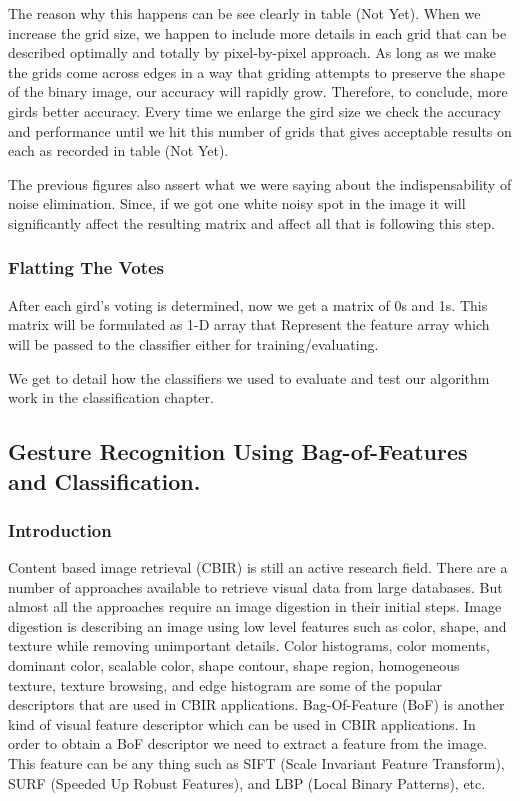 \documentclass[12pt,fleqn]{book} %
\begin{document}
The reason why this happens can be see clearly in table (Not Yet). When we increase the grid size, we happen to include more details in each grid that can be described optimally and totally by pixel-by-pixel approach. As long as we make the grids come across edges in a way that griding attempts to preserve the shape of the binary image, our accuracy will rapidly grow. Therefore, to conclude, more girds better accuracy. Every time we enlarge the gird size we check the accuracy and performance until we hit this number of grids that gives acceptable results on each as recorded in table (Not Yet).\bigskip

The previous figures also assert what we were saying about the indispensability of noise elimination. Since, if we got one white noisy spot in the image it will significantly affect the resulting matrix and affect all that is following this step.
\subsubsection{Flatting The Votes}
After each gird’s voting is determined, now we get a matrix of 0s and 1s. This matrix will be formulated as 1-D array that Represent the feature array which will be passed to the classifier either for training/evaluating.

We get to detail how the classifiers we used to evaluate and test our algorithm work in the classification chapter.
\subsection{Gesture Recognition Using Bag-of-Features and Classification.}
\subsubsection*{Introduction}
Content based image retrieval (CBIR) is still an active research field. There are a number of approaches available to retrieve visual data from large databases. But almost all the approaches require an image digestion in their initial steps. Image digestion is describing an image using low level features such as color, shape, and texture while removing unimportant details. Color histograms, color moments, dominant color, scalable color, shape contour, shape region, homogeneous texture, texture browsing, and edge histogram are some of the popular descriptors that are used in CBIR applications. Bag-Of-Feature (BoF) is another kind of visual feature descriptor which can be used in CBIR applications. In order to obtain a BoF descriptor we need to extract a feature from the image. This feature can be any thing such as SIFT (Scale Invariant Feature Transform), SURF (Speeded Up Robust Features), and LBP (Local Binary Patterns), etc.\bigskip
\end{document}
